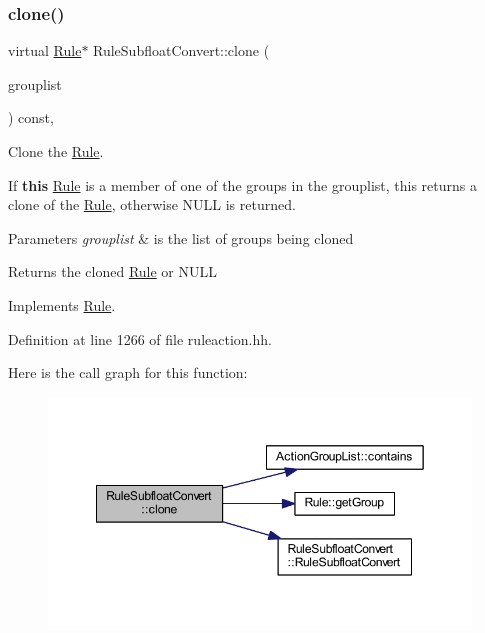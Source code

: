 \subsubsection{\texorpdfstring{clone()}{clone()}}
{\footnotesize\ttfamily virtual \mbox{\hyperlink{class_rule}{Rule}}$\ast$ Rule\+Subfloat\+Convert\+::clone (\begin{DoxyParamCaption}\item[{const \mbox{\hyperlink{class_action_group_list}{Action\+Group\+List}} \&}]{grouplist }\end{DoxyParamCaption}) const\hspace{0.3cm}{\ttfamily [inline]}, {\ttfamily [virtual]}}



Clone the \mbox{\hyperlink{class_rule}{Rule}}. 

If {\bfseries{this}} \mbox{\hyperlink{class_rule}{Rule}} is a member of one of the groups in the grouplist, this returns a clone of the \mbox{\hyperlink{class_rule}{Rule}}, otherwise N\+U\+LL is returned. 
\begin{DoxyParams}{Parameters}
{\em grouplist} & is the list of groups being cloned \\
\hline
\end{DoxyParams}
\begin{DoxyReturn}{Returns}
the cloned \mbox{\hyperlink{class_rule}{Rule}} or N\+U\+LL 
\end{DoxyReturn}


Implements \mbox{\hyperlink{class_rule_a70de90a76461bfa7ea0b575ce3c11e4d}{Rule}}.



Definition at line 1266 of file ruleaction.\+hh.

Here is the call graph for this function\+:
\nopagebreak
\begin{figure}[H]
\begin{center}
\leavevmode
\includegraphics[width=349pt]{class_rule_subfloat_convert_a017d2e6711abb9521250a93a85938856_cgraph}
\end{center}
\end{figure}
\mbox{\label{class_rule_subfloat_convert_a68e8f0b1861ca36ef9c19cf166533008}} 
